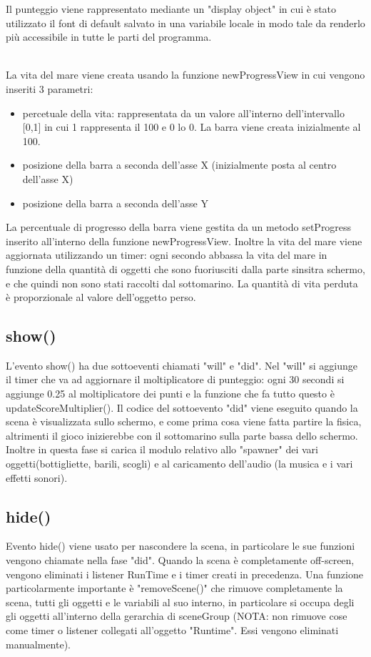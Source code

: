 \documentclass[12pt]{article}
\begin{document}
Il punteggio viene rappresentato mediante un "display object" in cui è stato utilizzato il font di default salvato in una variabile locale in modo tale da renderlo più accessibile in tutte le parti del programma. 

\\
La vita del mare viene creata usando la funzione newProgressView in cui vengono inseriti 3 parametri:
\begin{itemize}
    \item percetuale della vita: rappresentata da un valore all'interno dell'intervallo [0,1] in cui 1 rappresenta il 100 e 0 lo 0. La barra viene creata inizialmente al 100.
    \item posizione della barra a seconda dell'asse X (inizialmente posta al centro dell'asse X)
    \item posizione della barra a seconda dell'asse Y
\end{itemize}
La percentuale di progresso della barra viene gestita da un metodo setProgress inserito all'interno della funzione newProgressView. Inoltre la vita del mare viene aggiornata utilizzando un timer: ogni secondo abbassa la vita del mare in funzione della quantità di oggetti che sono fuoriusciti dalla parte sinsitra schermo, e che quindi non sono stati raccolti dal sottomarino. La quantità di vita perduta è proporzionale al valore dell'oggetto perso.

\subsection{show()}
L'evento show() ha due sottoeventi chiamati "will" e "did". Nel "will" si aggiunge il timer che va ad aggiornare il moltiplicatore di punteggio: ogni 30 secondi si aggiunge 0.25 al moltiplicatore dei punti e la funzione che fa tutto questo è updateScoreMultiplier(). Il codice del sottoevento "did" viene eseguito quando la scena è visualizzata sullo schermo, e come prima cosa viene fatta partire la fisica, altrimenti il gioco inizierebbe con il sottomarino sulla parte bassa dello schermo. Inoltre in questa fase si carica il modulo relativo allo "spawner" dei vari oggetti(bottigliette, barili, scogli) e al caricamento dell'audio (la musica e i vari effetti sonori).

\subsection{hide()}
Evento hide() viene usato per nascondere la scena, in particolare le sue funzioni vengono chiamate nella fase "did". Quando la scena è completamente off-screen, vengono eliminati i listener RunTime e i timer creati in precedenza. Una funzione particolarmente importante è "removeScene()" che rimuove completamente la scena, tutti gli oggetti e le variabili al suo interno,
in particolare si occupa degli gli oggetti all'interno della gerarchia di sceneGroup (NOTA: non rimuove cose come timer o listener collegati all'oggetto "Runtime". Essi vengono eliminati manualmente).
\end{document}
